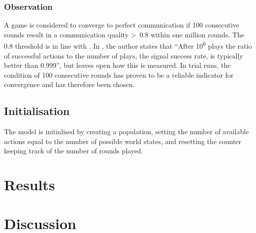 \documentclass[DIV=calc,BCOR=0mm,pagesize]{scrartcl}
\begin{document}
\subsubsection{Observation}
A game is considered to converge to perfect communication if 100 consecutive rounds result in a communication quality >~0.8 within one million rounds.
The 0.8 threshold is in line with \citet[p.~533]{barrett_numerical_2006, barrett_dynamic_2007}.
In \citet[sec.~2, unpaginated preprint]{barrett_numerical_2006}, the author states that ``After 10\textsuperscript{6} plays the ratio of successful actions to the number of plays, the signal success rate, is typically better than 0.999'', but leaves open how this is measured.
In trial runs, the condition of 100 consecutive rounds has proven to be a reliable indicator for convergence and has therefore been chosen.

\subsection{Initialisation}
\label{ssec:modini}
The model is initialised by creating a population, setting the number of available actions equal to the number of possible world states, and resetting the counter keeping track of the number of rounds played.

\section{Results}
\label{sec:res}

\section{Discussion}
\label{sec:dis}

\citep{wilensky_netlogo_1999}
\newpage\twocolumn\recalctypearea
\end{document}
